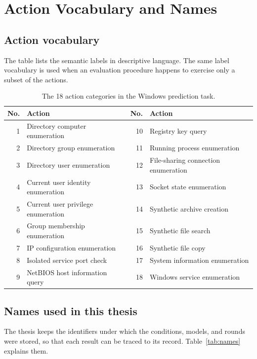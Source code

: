\chapter{Action Vocabulary and Names}
\label{app:actions}

\section{Action vocabulary}
\label{sec:app-action-list}

The table lists the semantic labels in descriptive language. The
same label vocabulary is used when an evaluation procedure happens
to exercise only a subset of the actions.

\begin{table}[htbp]
\centering
\caption{The 18 action categories in the Windows prediction task.}
\label{tab:actions}
\begin{tabularx}{\textwidth}{@{}rXrX@{}}
\toprule
No. & Action & No. & Action \\
\midrule
1 & Directory computer enumeration & 10 & Registry key query \\
2 & Directory group enumeration & 11 & Running process enumeration \\
3 & Directory user enumeration & 12 & File-sharing connection enumeration \\
4 & Current user identity enumeration & 13 & Socket state enumeration \\
5 & Current user privilege enumeration & 14 & Synthetic archive creation \\
6 & Group membership enumeration & 15 & Synthetic file search \\
7 & IP configuration enumeration & 16 & Synthetic file copy \\
8 & Isolated service port check & 17 & System information enumeration \\
9 & NetBIOS host information query & 18 & Windows service enumeration \\
\bottomrule
\end{tabularx}
\end{table}

\section{Names used in this thesis}
\label{sec:app-names}

The thesis keeps the identifiers under which the conditions, models,
and rounds were stored, so that each result can be traced to its
record. Table~\ref{tab:names} explains them.

